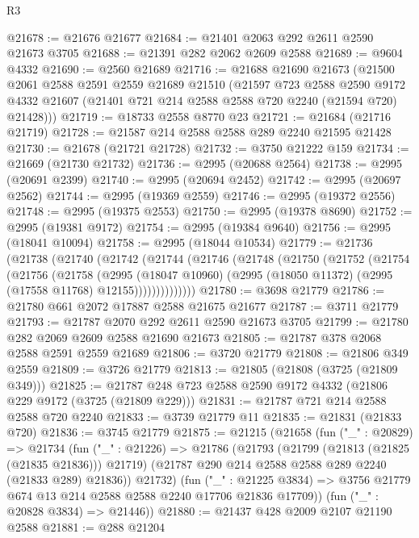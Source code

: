\begin{lexlean}{R3}
\begin{coremodule}
@21678 := @21676 @21677
@21684 := @21401 @2063 @292 @2611 @2590 @21673 @3705
@21688 := @21391 @282 @2062 @2609 @2588
@21689 := @9604 @4332
@21690 := @2560 @21689
@21716 := @21688
    @21690
    @21673
    (@21500
      @2061
      @2588
      @2591
      @2559
      @21689
      @21510
      (@21597
        @723
        @2588
        @2590
        @9172
        @4332
        @21607
        (@21401 @721 @214 @2588 @2588 @720 @2240 (@21594 @720) @21428)))
@21719 := @18733 @2558 @8770 @23
@21721 := @21684 (@21716 @21719)
@21728 := @21587 @214 @2588 @2588 @289 @2240 @21595 @21428
@21730 := @21678 (@21721 @21728)
@21732 := @3750 @21222 @159
@21734 := @21669 (@21730 @21732)
@21736 := @2995 (@20688 @2564)
@21738 := @2995 (@20691 @2399)
@21740 := @2995 (@20694 @2452)
@21742 := @2995 (@20697 @2562)
@21744 := @2995 (@19369 @2559)
@21746 := @2995 (@19372 @2556)
@21748 := @2995 (@19375 @2553)
@21750 := @2995 (@19378 @8690)
@21752 := @2995 (@19381 @9172)
@21754 := @2995 (@19384 @9640)
@21756 := @2995 (@18041 @10094)
@21758 := @2995 (@18044 @10534)
@21779 := @21736
    (@21738
      (@21740
        (@21742
          (@21744
            (@21746
              (@21748
                (@21750
                  (@21752
                    (@21754
                      (@21756
                        (@21758
                          (@2995
                            (@18047 @10960)
                            (@2995 (@18050 @11372) (@2995 (@17558 @11768) @12155))))))))))))))
@21780 := @3698 @21779
@21786 := @21780 @661 @2072 @17887 @2588 @21675 @21677
@21787 := @3711 @21779
@21793 := @21787 @2070 @292 @2611 @2590 @21673 @3705
@21799 := @21780 @282 @2069 @2609 @2588 @21690 @21673
@21805 := @21787 @378 @2068 @2588 @2591 @2559 @21689
@21806 := @3720 @21779
@21808 := @21806 @349 @2559
@21809 := @3726 @21779
@21813 := @21805 (@21808 (@3725 (@21809 @349)))
@21825 := @21787 @248 @723 @2588 @2590 @9172 @4332 (@21806 @229 @9172 (@3725 (@21809 @229)))
@21831 := @21787 @721 @214 @2588 @2588 @720 @2240
@21833 := @3739 @21779 @11
@21835 := @21831 (@21833 @720)
@21836 := @3745 @21779
@21875 := @21215
    (@21658
      (fun ("_" : @20829) =>
      @21734
        (fun ("_" : @21226) =>
        @21786
          (@21793
            (@21799 (@21813 (@21825 (@21835 @21836))) @21719)
            (@21787 @290 @214 @2588 @2588 @289 @2240 (@21833 @289) @21836))
          @21732)
        (fun ("_" : @21225 @3834) =>
        @3756 @21779 @674 @13 @214 @2588 @2588 @2240 @17706 @21836 @17709))
      (fun ("_" : @20828 @3834) => @21446))
@21880 := @21437 @428 @2009 @2107 @21190 @2588
@21881 := @288 @21204

\end{coremodule}
\end{lexlean}
